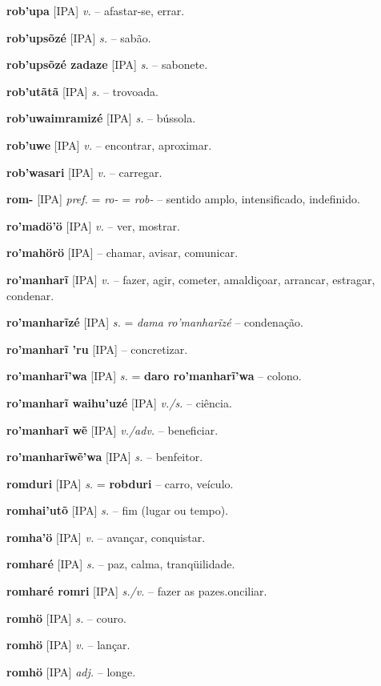 \textbf{rob'upa} [IPA] \textit{v.} -- afastar-se, errar.

\textbf{rob'upsõzé} [IPA] \textit{s.} -- sabão.

\textbf{rob'upsõzé zadaze} [IPA] \textit{s.} -- sabonete.

\textbf{rob'utãtã} [IPA] \textit{s.} -- trovoada.

\textbf{rob'uwaimramizé} [IPA] \textit{s.} -- bússola.

\textbf{rob'uwe} [IPA] \textit{v.} -- encontrar, aproximar.

\textbf{rob'wasari} [IPA] \textit{v.} -- carregar.

\textbf{rom-} [IPA] \textit{pref.} = \textit{ro-} = \textit{rob-} -- sentido amplo, intensificado, indefinido.

\textbf{ro'madö'ö} [IPA] \textit{v.} -- ver, mostrar.

\textbf{ro'mahörö} [IPA] \textit{} -- chamar, avisar, comunicar.

\textbf{ro'manharĩ} [IPA] \textit{v.} -- fazer, agir, cometer, amaldiçoar, arrancar, estragar, condenar.

\textbf{ro'manharĩzé} [IPA] \textit{s.} = \textit{dama ro'manharĩzé} -- condenação.

\textbf{ro'manharĩ 'ru} [IPA] \textit{} -- concretizar.

\textbf{ro'manharĩ'wa} [IPA] \textit{s.} = \textbf{daro ro'manharĩ'wa} -- colono.

\textbf{ro'manharĩ waihu'uzé} [IPA] \textit{v./s.} -- ciência.

\textbf{ro'manharĩ wẽ} [IPA] \textit{v./adv.} -- beneficiar.

\textbf{ro'manharĩwẽ'wa} [IPA] \textit{s.} -- benfeitor.

\textbf{romduri} [IPA] \textit{s.} = \textbf{robduri} -- carro, veículo.

\textbf{romhai'utõ} [IPA] \textit{s.} -- fim (lugar ou tempo).

\textbf{romha'ö} [IPA] \textit{v.} -- avançar, conquistar.

\textbf{romharé} [IPA] \textit{s.} -- paz, calma, tranqüilidade.

\textbf{romharé romri} [IPA] \textit{s./v.} -- fazer as pazes.onciliar.

\textbf{romhö} [IPA] \textit{s.} -- couro.

\textbf{romhö} [IPA] \textit{v.} -- lançar.

\textbf{romhö} [IPA] \textit{adj.} -- longe.


